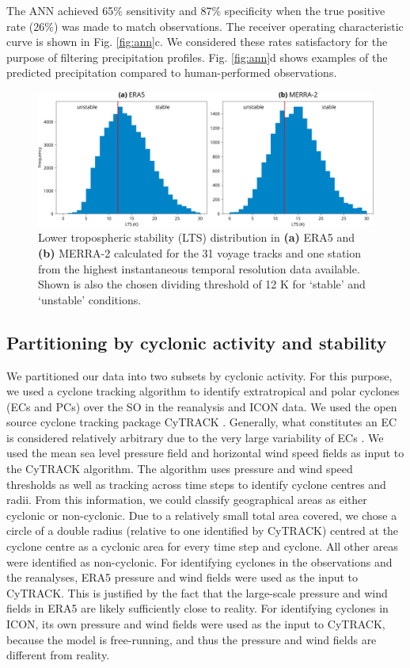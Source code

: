 \documentclass[12pt,a4paper]{article}
\begin{document}
The ANN achieved 65\% sensitivity and 87\% specificity when the true positive
rate (26\%) was made to match observations. The receiver operating
characteristic curve is shown in Fig. \ref{fig:ann}c. We considered these rates
satisfactory for the purpose of filtering precipitation profiles. Fig.
\ref{fig:ann}d shows examples of the predicted precipitation compared to
human-performed observations.

\begin{figure}[b!]
\centering
\includegraphics[width=\textwidth]{img/lts_dist.pdf}
\caption{
Lower tropospheric stability (LTS) distribution in \textbf{(a)} ERA5 and
\textbf{(b)} MERRA-2 calculated for the 31 voyage tracks and one station from
the highest instantaneous temporal resolution data available. Shown is also the
chosen dividing threshold of 12 K for `stable' and `unstable' conditions.
}
\label{fig:lts}
\end{figure}

\subsection{Partitioning by cyclonic activity and stability}

We partitioned our data into two subsets by cyclonic activity. For this
purpose, we used a cyclone tracking algorithm to identify extratropical and
polar cyclones (ECs and PCs) over the SO in the reanalysis and ICON data. We
used the open source cyclone tracking package CyTRACK
\citep{perez-alarcon2024}.  Generally, what constitutes an EC is considered
relatively arbitrary due to the very large variability of ECs \citep{neu2013}.
We used the mean sea level pressure field and horizontal wind speed fields as
input to the CyTRACK algorithm. The algorithm uses pressure and wind speed
thresholds as well as tracking across time steps to identify cyclone centres
and radii. From this information, we could classify geographical areas as
either cyclonic or non-cyclonic. Due to a relatively small total area covered,
we chose a circle of a double radius (relative to one identified by CyTRACK)
centred at the cyclone centre as a cyclonic area for every time step and
cyclone. All other areas were identified as non-cyclonic. For identifying
cyclones in the observations and the reanalyses, ERA5 pressure and wind fields
were used as the input to CyTRACK.  This is justified by the fact that the
large-scale pressure and wind fields in ERA5 are likely sufficiently close to
reality. For identifying cyclones in ICON, its own pressure and wind fields
were used as the input to CyTRACK, because the model is free-running, and thus
the pressure and wind fields are different from reality.
\end{document}
